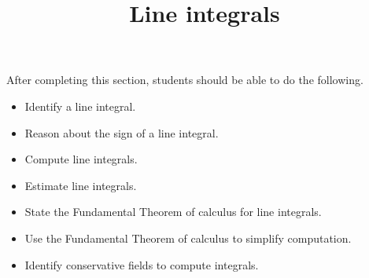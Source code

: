 \documentclass{ximera}
\title{Line integrals}
\begin{document}
\begin{abstract}
\end{abstract}
\maketitle

\begin{sectionOutcomes}

After completing this section, students should be able to do the following.

\begin{itemize}
\item Identify a line integral.
\item Reason about the sign of a line integral.
\item Compute line integrals.
\item Estimate line integrals.
\item State the Fundamental Theorem of calculus for line integrals.
\item Use the Fundamental Theorem of calculus to simplify computation.
\item Identify conservative fields to compute integrals.
\end{itemize}

\end{sectionOutcomes}
\end{document}
